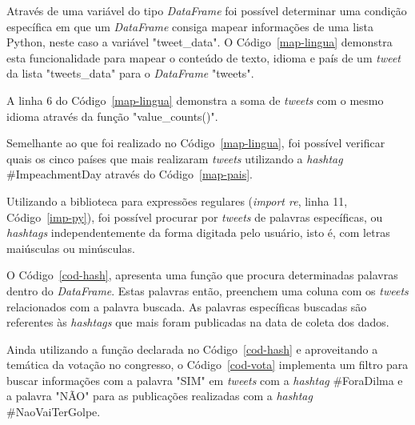 Através de uma variável do tipo \textit{DataFrame} foi possível determinar uma condição específica em que um \textit{DataFrame} consiga mapear informações de uma lista Python, neste caso a variável "tweet\_data". O Código~\ref{map-lingua} demonstra esta funcionalidade para mapear o conteúdo de texto, idioma e país de um \textit{tweet} da lista "tweets\_data" \space para o \textit{DataFrame} "tweets".

A linha 6 do Código~\ref{map-lingua} demonstra a soma de \textit{tweets} com o mesmo idioma através da função "value\_counts()".



Semelhante ao que foi realizado no Código~\ref{map-lingua}, foi possível verificar quais os cinco países que mais realizaram \textit{tweets} utilizando a \textit{hashtag} \#ImpeachmentDay através do Código~\ref{map-pais}.



Utilizando a biblioteca para expressões regulares (\textit{import re}, linha 11, Código~\ref{imp-py}), foi possível procurar por \textit{tweets} de palavras específicas, ou \textit{hashtags} independentemente da forma digitada pelo usuário, isto é, com letras maiúsculas ou minúsculas.

O Código~\ref{cod-hash}, apresenta uma função que procura determinadas palavras dentro do \textit{DataFrame}. Estas palavras então, preenchem uma coluna com os \textit{tweets} relacionados com a palavra buscada. As palavras específicas buscadas são referentes às \textit{hashtags} que mais foram publicadas na data de coleta dos dados.



Ainda utilizando a função declarada no Código~\ref{cod-hash} e aproveitando a temática da votação no congresso, o Código~\ref{cod-vota} implementa um filtro para buscar informações com a palavra "SIM" \space em \textit{tweets} com a \textit{hashtag} \#ForaDilma e a palavra "NÃO" \space para as publicações realizadas com a \textit{hashtag} \#NaoVaiTerGolpe.



